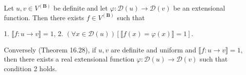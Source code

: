Let $u, v \in V^{(\mathbf{B})}$ be definite and let $\varphi: \mathcal{D}(u) \rightarrow \mathcal{D}(v)$ be an extensional function. Then there exists $f \in V^{(\mathbf{B})}$ such that

1. $\llbracket f: u \rightarrow v \rrbracket = 1$,
2. $(\forall x \in \mathcal{D}(u))[\llbracket f(x) = \varphi(x) \rrbracket = 1]$.

Conversely (Theorem 16.28), if $u, v$ are definite and uniform and $\llbracket f: u \rightarrow v \rrbracket = 1$, then there exists a real extensional function $\varphi: \mathcal{D}(u) \rightarrow \mathcal{D}(v)$ such that condition 2 holds.
